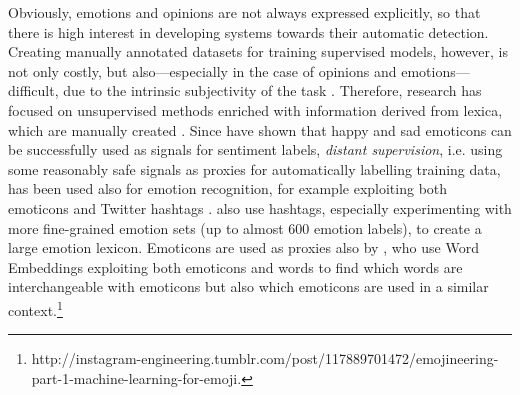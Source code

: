 \documentclass[11pt]{article}
\begin{document}
Obviously, emotions and opinions are not always expressed explicitly, so that there is high interest in developing systems towards their automatic detection. Creating manually annotated datasets for training supervised models, however, is not only costly, but also---especially in the case of opinions and emotions---difficult, due to the intrinsic subjectivity of the task \cite{strapparava2008learning,kim2010evaluation}. Therefore, research has focused on unsupervised methods enriched with information derived from lexica, which are manually created \cite{chaffar2011using,kim2010evaluation}. Since  have shown that happy and sad emoticons can be successfully used as signals for sentiment labels, \textit{distant supervision}, i.e.  using some reasonably safe signals as proxies for automatically labelling training data, has been used also for emotion recognition, for example exploiting both emoticons and Twitter hashtags \cite{purver2012experimenting}.  also use hashtags, especially experimenting with more fine-grained emotion sets (up to almost 600 emotion labels), to create a large emotion lexicon. Emoticons are used as proxies also by , who use Word Embeddings exploiting both emoticons and words to find which words are interchangeable with emoticons but also which emoticons are used in a similar context.\footnote{{http://instagram-engineering.tumblr.com/post/117889701472/emojineering-part-1-machine-learning-for-emoji}.}


%
%
%
%
\end{document}
